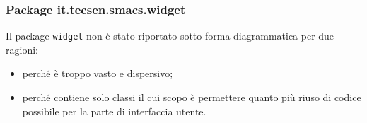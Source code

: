 \subsubsection{Package it.tecsen.smacs.widget}
\label{subsubsubsec:it-tecsen-smacs-widget}

Il package \texttt{widget} non è stato riportato sotto forma diagrammatica per due ragioni:
\begin{itemize}
  \item perché è troppo vasto e dispersivo;
  \item perché contiene solo classi il cui scopo è permettere quanto più riuso di codice possibile per la parte di interfaccia utente.
\end{itemize}